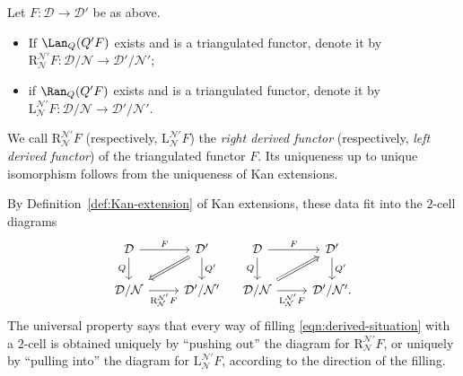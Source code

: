 \begin{definition}\label{def:Verdier-localization-functor}
	Let $F: \mathcal{D} \to \mathcal{D}'$ be as above.
	\begin{itemize}
		\item If $\Lan_Q(Q' F)$ exists and is a triangulated functor, denote it by
		$\mathrm{R}^{\mathcal{N}'}_{\mathcal{N}} F:
		\mathcal{D}/\mathcal{N} \to \mathcal{D}'/\mathcal{N}'$;
		\item if $\Ran_Q(Q' F)$ exists and is a triangulated functor, denote it by
		$\mathrm{L}^{\mathcal{N}'}_{\mathcal{N}} F:
		\mathcal{D}/\mathcal{N} \to \mathcal{D}'/\mathcal{N}'$.
	\end{itemize}
	We call $\mathrm{R}^{\mathcal{N}'}_{\mathcal{N}} F$ (respectively,
	$\mathrm{L}^{\mathcal{N}'}_{\mathcal{N}} F$) the \emph{right derived
	functor} (respectively, \emph{left derived functor}) of the triangulated
	functor $F$. Its uniqueness up to unique isomorphism follows from the
	uniqueness of Kan extensions.
\end{definition}

By Definition~\ref{def:Kan-extension} of Kan extensions, these data fit into
the $2$-cell diagrams
\begin{equation}\label{eqn:derived-can-morphism}\begin{tikzcd}
	\mathcal{D} \arrow[r, "F"] \arrow[d, "Q"'] & \mathcal{D}' \arrow[d, "{Q'}"] \arrow[Rightarrow, ld] \\
	\mathcal{D}/\mathcal{N} \arrow[r, "{\mathrm{R}^{\mathcal{N}'}_{\mathcal{N}} F}"'] & \mathcal{D}'/\mathcal{N}'
\end{tikzcd} \quad \begin{tikzcd}
	\mathcal{D} \arrow[r, "F"] \arrow[d, "Q"'] & \mathcal{D}' \arrow[d, "{Q'}"] \\
	\mathcal{D}/\mathcal{N} \arrow[r, "{\mathrm{L}^{\mathcal{N}'}_{\mathcal{N}} F}"'] \arrow[Rightarrow, ru] & \mathcal{D}'/\mathcal{N}' .
\end{tikzcd}\end{equation}
The universal property says that every way of filling
\eqref{eqn:derived-situation} with a $2$-cell is obtained uniquely by
``pushing out'' the diagram for
$\mathrm{R}^{\mathcal{N}'}_{\mathcal{N}}F$, or uniquely by ``pulling into''
the diagram for $\mathrm{L}^{\mathcal{N}'}_{\mathcal{N}}F$, according to the
direction of the filling.

